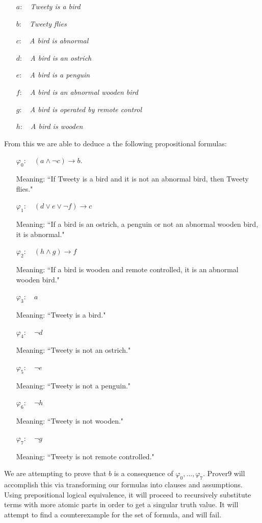 \documentclass[fullpage]{article}
\begin{document}
\begin{itemize}
\item[$a$:]~ {\em Tweety is a bird}
\item[$b$:]~ {\em Tweety flies}
\item[$c$:]~ {\em A bird is abnormal}
\item[$d$:]~ {\em A bird is an ostrich}
\item[$e$:]~ {\em A bird is a penguin}
\item[$f$:]~ {\em A bird is an abnormal wooden bird}
\item[$g$:]~ {\em A bird is operated by remote control}
\item[$h$:]~ {\em A bird is wooden}
\end{itemize}
From this we are able to deduce a the following propositional formulas:
\begin{itemize}
\item[$\varphi_0$:]~ ${(a \wedge \neg c) \rightarrow b}$.

 Meaning: ``If Tweety is a bird and it is not an abnormal bird, then Tweety flies."
\item[$\varphi_1$:]~ ${(d \lor e \lor \neg f) \rightarrow c}$

     Meaning: ``If a bird is an ostrich, a penguin or not an abnormal wooden bird, it is abnormal."
\item[$\varphi_2$:]~ ${(h \wedge g) \rightarrow f}$

 Meaning: ``If a bird is wooden and remote controlled, it is an abnormal wooden bird."
\item[$\varphi_3$:]~ ${a}$

 Meaning: ``Tweety is a bird."
\item[$\varphi_4$:]~ ${\neg d}$

 Meaning: ``Tweety is not an ostrich."
\item[$\varphi_5$:]~ ${\neg e}$

 Meaning: ``Tweety is not a penguin."
\item[$\varphi_6$:]~ ${\neg h}$

 Meaning: ``Tweety is not wooden."
\item[$\varphi_7$:]~ ${\neg g}$

 Meaning: ``Tweety is not remote controlled."
\end{itemize}
We are attempting to prove that $b$ is a consequence of $\varphi_0, \ldots, \varphi_7$. Prover9 will accomplish this via transforming our formulas into clauses and assumptions. Using prepositional logical equivalence, it will proceed to recursively substitute terms with more atomic parts in order to get a singular truth value. It will attempt to find a counterexample for the set of formula, and will fail.
\end{document}
